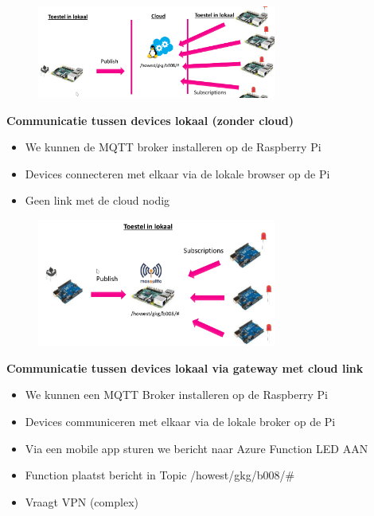 \documentclass{article}
\newcommand{\bold}[1]{\textbf{#1}}
\begin{document}
\begin{figure}[H]
    \centering
    \includegraphics[width=0.7\textwidth]{mqtt-com3.png}
    \caption{}
\end{figure}

\bold{Communicatie tussen devices lokaal (zonder cloud)}

\begin{itemize}
    \item We kunnen de MQTT broker installeren op de Raspberry Pi
    \item Devices connecteren met elkaar via de lokale browser op de Pi
    \item Geen link met de cloud nodig
\end{itemize}

\begin{figure}[H]
    \centering
    \includegraphics[width=0.7\textwidth]{mqtt-com4.png}
    \caption{}
\end{figure}

\bold{Communicatie tussen devices lokaal via gateway met cloud link}

\begin{itemize}
    \item We kunnen een MQTT Broker installeren op de Raspberry Pi
    \item Devices communiceren met elkaar via de lokale broker op de Pi
    \item Via een mobile app sturen we bericht naar Azure Function LED AAN
    \item Function plaatst bericht in Topic /howest/gkg/b008/\#
    \item Vraagt VPN (complex)
\end{itemize}
\end{document}
